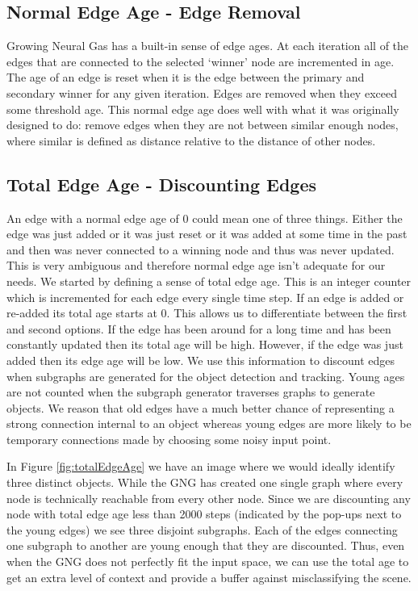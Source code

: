 \documentclass{article}
\renewcommand{\|}{\origbar} %
\begin{document}
\subsection{Normal Edge Age - Edge Removal}

Growing Neural Gas has a built-in sense of edge ages. At each iteration all of the edges that are connected to the selected `winner' node are incremented in age. The age of an edge is reset when it is the edge between the primary and secondary winner for any given iteration. Edges are removed when they exceed some threshold age. This normal edge age does well with what it was originally designed to do: remove edges when they are not between similar enough nodes, where similar is defined as distance relative to the distance of other nodes.

\subsection{Total Edge Age - Discounting Edges}

An edge with a normal edge age of 0 could mean one of three things. Either the edge was just added or it was just reset or it was added at some time in the past and then was never connected to a winning node and thus was never updated. This is very ambiguous and therefore normal edge age isn't adequate for our needs. We started by defining a sense of total edge age. This is an integer counter which is incremented for each edge every single time step. If an edge is added or re-added its total age starts at 0. This allows us to differentiate between the first and second options. If the edge has been around for a long time and has been constantly updated then its total age will be high. However, if the edge was just added then its edge age will be low. We use this information to discount edges when subgraphs are generated for the object detection and tracking. Young ages are not counted when the subgraph generator traverses graphs to generate objects. We reason that old edges have a much better chance of representing a strong connection internal to an object whereas young edges are more likely to be temporary connections made by choosing some noisy input point. 

In Figure \ref{fig:totalEdgeAge} we have an image where we would ideally identify three distinct objects. While the GNG has created one single graph where every node is technically reachable from every other node. Since we are discounting any node with total edge age less than 2000 steps (indicated by the pop-ups next to the young edges) we see three disjoint subgraphs. Each of the edges connecting one subgraph to another are young enough that they are discounted. Thus, even when the GNG does not perfectly fit the input space, we can use the total age to get an extra level of context and provide a buffer against misclassifying the scene.
\end{document}
